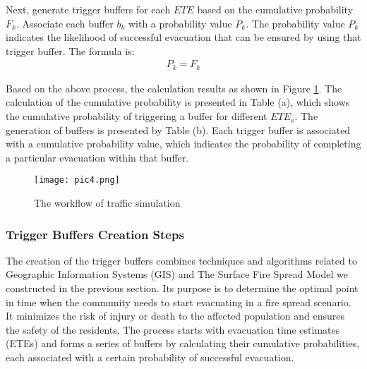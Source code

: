 \documentclass[12pt]{article}  %
\begin{document}
Next, generate trigger buffers for each \(ETE \) based on the cumulative probability \(F_k \). Associate each buffer \(b_k \) with a probability value \(P_k \). The probability value \(P_k \) indicates the likelihood of successful evacuation that can be ensured by using that trigger buffer. The formula is:
\begin{equation}
	\begin{aligned}
		P_k = F_k 
	\end{aligned}
\end{equation}
 
Based on the above process, the calculation results as shown in Figure \ref{pic4}. The calculation of the cumulative probability is presented in  Table (a), which shows the cumulative probability of triggering a buffer for different \( ETE_s \). The generation of buffers is presented by Table (b). Each trigger buffer is associated with a cumulative probability value, which indicates the probability of completing a particular evacuation within that buffer.
\begin{figure}[htbp]  
	\centering  
	\texttt{[image: pic4.png]} 
	\caption{The workflow of traffic simulation} 
	\label{pic4}
\end{figure}
\vspace{-0.5cm}

\subsubsection*{Trigger Buffers Creation Steps}
The creation of the trigger buffers combines techniques and algorithms related to Geographic Information Systems (GIS) and The Surface Fire Spread Model we constructed in the previous section. Its purpose is to determine the optimal point in time when the community needs to start evacuating in a fire spread scenario. It minimizes the risk of injury or death to the affected population and ensures the safety of the residents. The process starts with evacuation time estimates (ETEs) and forms a series of buffers by calculating their cumulative probabilities, each associated with a certain probability of successful evacuation.
\end{document}
